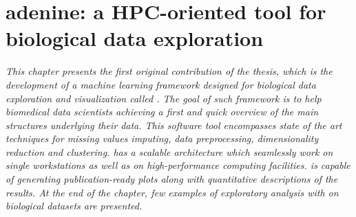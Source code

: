 
\chapter{{\sc adenine}: a HPC-oriented tool for biological data exploration} \label{chap:adenine}

\begin{displayquote}
\textit{This chapter presents the first original contribution of the thesis, which is the 	 development of a machine learning framework designed for biological data exploration and visualization called \ade.
The goal of such framework is to help biomedical data scientists achieving a first and quick overview of the main structures underlying their data.
This software tool encompasses state of the art techniques for missing values imputing, data preprocessing, dimensionality reduction and clustering.
\ade has a scalable architecture which seamlessly work on single workstations as well as on high-performance computing facilities.
\ade is capable of generating publication-ready plots along with quantitative descriptions of the results.
At the end of the chapter, few examples of exploratory analysis with \ade on biological datasets are presented.}
\end{displayquote}


